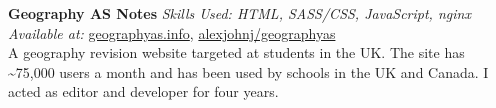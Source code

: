 \textbf{Geography AS Notes}  \newline
\textit{Skills Used: HTML, SASS/CSS, JavaScript, nginx}\\
\textit{Available at:} \href{https://geographyas.info}{geographyas.info}, \href{https://github.com/\myweb/geographyas}{alexjohnj/geographyas} \\
A geography revision website targeted at students in the UK. The site has
\textasciitilde{}75,000 users a month and has been used by schools in the UK and
Canada. I acted as editor and developer for four years.

